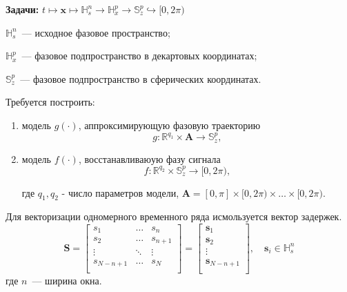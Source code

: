 \textbf{Задачи:} $ t \mapsto \mathbf{x} \mapsto \mathbb{H}_{s}^{n} \xrightarrow{} \mathbb{H}_{x}^{p} \xrightarrow{} \mathbb{S}_z^{p} \hookrightarrow [0,2\pi)$
    
    $\mathbb{H}_{s}^{n}$~--- исходное фазовое пространство;
    
    $\mathbb{H}_{x}^{p}$~--- фазовое подпространство в декартовых координатах;
    
    $\mathbb{S}_{z}^{p}$~--- фазовое подпространство в сферических координатах.
    
    \medskip
    Требуется построить:
    \begin{enumerate}
        \item модель $g(\cdot)$, аппроксимирующую фазовую траекторию
    \[ g: \mathbb{R}^{q_1} \times \mathbf{A} \xrightarrow{} \mathbb{S}_{z}^{p},\]
    
        \item модель $f(\cdot)$, восстанавливаюую фазу сигнала
    \[ f: \mathbb{R}^{q_2} \times \mathbb{S}_{z}^{p} \xrightarrow{} [0,2\pi),\]
    
    где $q_1,q_2$ - число параметров модели, $\mathbf{A} = [0,\pi]\times[0,2\pi)\times \dots \times [0,2\pi)$.
    \end{enumerate}
Для векторизации одномерного временного ряда исмользуется вектор задержек.
\[\mathbf{S} = 
\begin{bmatrix} 
	s_{1} & \ldots & s_{n}\\
	s_{2} & \ldots & s_{n+1}\\
	\vdots& \ddots & \vdots\\
	s_{N-n+1}&\ldots &s_{N}\\
\end{bmatrix} =
	\begin{bmatrix} 
      	\mathbf{s}_{1}\\
      	\mathbf{s}_{2}\\
      	\vdots\\
      	\mathbf{s}_{N-n+1}\\
   \end{bmatrix},
   \quad
   \mathbf{s}_{i} \in \mathbb{H}_{s}^{n}
   \]
где $n$~--- ширина окна.

